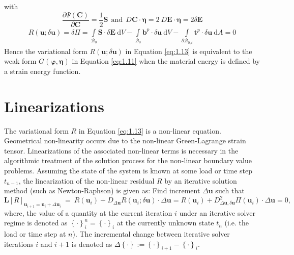 \documentclass[11pt,a4paper,final]{article}
\begin{document}
with 
\begin{equation}
\dfrac{\partial \Psi (\mathbf{C})}{\partial \mathbf{C}} = \dfrac{1}{2} \mathbf{S} \ \ \text{and} \ \ D \mathbf{C} \cdot \bm{\eta} = 2 \ D \mathbf{E} \cdot \bm{\eta} = 2 \delta \mathbf{E}
\label{eq:1.12.2}
\end{equation}
\begin{align}
R(\mathbf{u}; \delta \mathbf{u}) =\delta \Pi = \int\limits_{\mathcal{B}_0} \mathbf{S} \cdot \delta \mathbf{E} \ \mathrm{d}V - \int\limits_{\mathcal{B}_0} \mathbf{b}^p \cdot \delta \mathbf{u} \ \mathrm{d}V - \int\limits_{\mathcal{\partial B}_{0,t}} \mathbf{t}^p \cdot \delta \mathbf{u} \ \mathrm{d}A = 0 
\label{eq:1.13}
\end{align}
Hence the variational form $R(\mathbf{u}; \delta \mathbf{u})$ in Equation \eqref{eq:1.13} is equivalent to the weak form $G(\bm{\varphi},\bm{\eta})$ in Equation \eqref{eq:1.11} when the material energy is defined by a strain energy function. 

\section{Linearizations}
The variational form $R$ in Equation \eqref{eq:1.13} is a non-linear equation. Geometrical non-linearity occurs due to the non-linear Green-Lagrange strain tensor. Linearizations of the associated non-linear terms is necessary in the algorithmic treatment of the solution process for the non-linear boundary value problems. Assuming the state of the system is known at some load or time step $t_{n-1}$, the linearization of the non-linear residual $R$ by an iterative solution method (such as Newton-Raphson) is given as: Find increment $\Delta \mathbf{u}$ such that 
\begin{equation}
\mathbf{L}\left[ R \right]_{\mathbf{u}_{i+1} = \mathbf{u}_{i} + \Delta \mathbf{u}_i} \ = \ R(\mathbf{u}_{i}) + D_{\Delta\mathbf{u}} R(\mathbf{u}_i; \delta \mathbf{u}) \cdot \Delta\mathbf{u} = R(\mathbf{u}_{i}) + D^2_{\Delta\mathbf{u}, \delta\mathbf{u}} \Pi(\mathbf{u}_{i}) \cdot \Delta\mathbf{u} = 0,
\label{eq:1.14}
\end{equation}
where, the value of a quantity at the current iteration $i$ under an iterative solver regime is denoted as ${\left\lbrace \cdot \right\rbrace}_{i}^{n} = {\left\lbrace \cdot \right\rbrace}_{i}$ at the currently unknown state $t_n$ (i.e. the load or time step at $n$). The incremental change between iterative solver iterations $i$ and $i+1$ is denoted as $\Delta \left\lbrace \cdot \right\rbrace := {\left\lbrace \cdot \right\rbrace}_{i+1} - {\left\lbrace \cdot \right\rbrace}_{i}$. \par 
\end{document}
